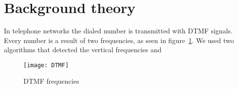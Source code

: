 \section{Background theory}
In telephone networks the dialed number is transmitted  with DTMF signals. Every number is  a result of two frequencies, as seen in  figure~\ref{fig:DTMF}. We used two algorithms that detected the vertical frequencies and 

\begin{figure}[H]
  \centering
  \texttt{[image: DTMF]}
  \caption{DTMF frequencies ~\cite{DTMF}}
\label{fig:DTMF}

\end{figure}